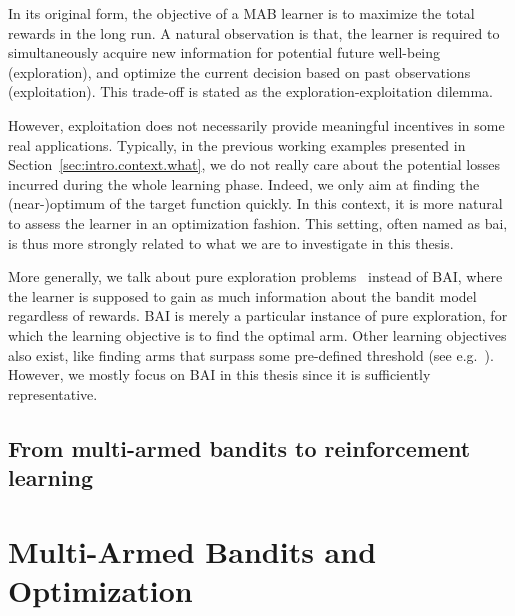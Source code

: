 In its original form, the objective of a MAB learner is to maximize the total rewards in the long run. A natural observation is that, the learner is required to simultaneously acquire new information for potential future well-being (exploration), and optimize the current decision based on past observations (exploitation). This trade-off is stated as the \gls{exploration-exploitation dilemma}. 

However, exploitation does not necessarily provide meaningful incentives in some real applications. Typically, in the previous working examples presented in Section~\ref{sec:intro.context.what}, we do not really care about the potential losses incurred during the whole learning phase. Indeed, we only aim at finding the (near-)optimum of the target function quickly. In this context, it is more natural to assess the learner in an optimization fashion. This setting, often named as \gls{bai}, is thus more strongly related to what we are to investigate in this thesis.

\begin{remark}
\begin{leftbar}[remarkbar]
More generally, we talk about \gls{pure exploration} problems~\citep{bubeck2011pure} instead of BAI, where the learner is supposed to gain as much information about the bandit model regardless of rewards. BAI is merely a particular instance of pure exploration, for which the learning objective is to find the optimal arm. Other learning objectives also exist, like finding arms that surpass some pre-defined threshold (see e.g.~\citealt{locatelli2016thresholding}). However, we mostly focus on BAI in this thesis since it is sufficiently representative.
\end{leftbar}
\end{remark}

\subsection{From multi-armed bandits to reinforcement learning}\label{sec:intro.context.rl}

\section{Multi-Armed Bandits and Optimization}\label{sec:intro.mab}
    
